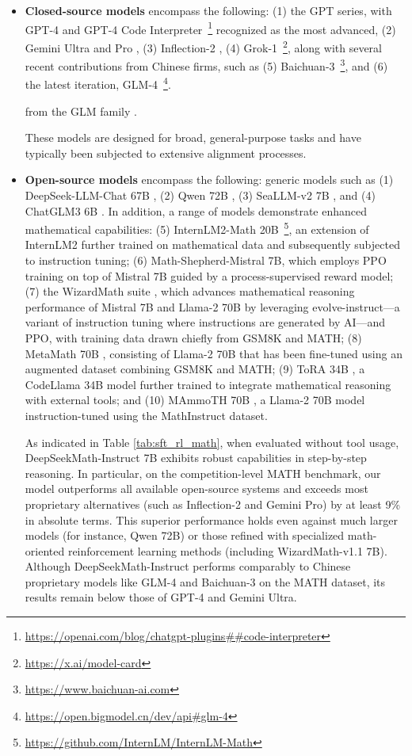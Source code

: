 \begin{itemize}[topsep=0pt]
\begin{itemize}[topsep=0pt]
    \item \textbf{Closed-source models} encompass the following: (1) the GPT series, with GPT-4 \citep{gpt4} and GPT-4 Code Interpreter~\footnote{\url{https://openai.com/blog/chatgpt-plugins\#\#code-interpreter}} recognized as the most advanced, (2) Gemini Ultra and Pro \citep{gemini}, (3) Inflection-2 \citep{inflection-2}, (4) Grok-1~\footnote{\url{https://x.ai/model-card}}, along with several recent contributions from Chinese firms, such as (5) Baichuan-3~\footnote{\url{https://www.baichuan-ai.com}}, and (6) the latest iteration, GLM-4~\footnote{\url{https://open.bigmodel.cn/dev/api\#glm-4}}.

    from the GLM family \citep{glm}.

These models are designed for broad, general-purpose tasks and have typically been subjected to extensive alignment processes.
\item \textbf{Open-source models} encompass the following: generic models such as (1) DeepSeek-LLM-Chat 67B \citep{deepseek-llm}, (2) Qwen 72B \citep{qwen}, (3) SeaLLM-v2 7B \citep{seallm}, and (4) ChatGLM3 6B \citep{chatglm3}. In addition, a range of models demonstrate enhanced mathematical capabilities: (5) InternLM2-Math 20B~\footnote{\url{https://github.com/InternLM/InternLM-Math}}, an extension of InternLM2 further trained on mathematical data and subsequently subjected to instruction tuning; (6) Math-Shepherd-Mistral 7B, which employs PPO training \citep{schulman2017proximal} on top of Mistral 7B \citep{mistral} guided by a process-supervised reward model; (7) the WizardMath suite \citep{wizardmath}, which advances mathematical reasoning performance of Mistral 7B and Llama-2 70B \citep{llama2} by leveraging evolve-instruct—a variant of instruction tuning where instructions are generated by AI—and PPO, with training data drawn chiefly from GSM8K and MATH; (8) MetaMath 70B \citep{metamath}, consisting of Llama-2 70B that has been fine-tuned using an augmented dataset combining GSM8K and MATH; (9) ToRA 34B \cite{tora}, a CodeLlama 34B model further trained to integrate mathematical reasoning with external tools; and (10) MAmmoTH 70B \citep{MathInstruct}, a Llama-2 70B model instruction-tuned using the MathInstruct dataset.

As indicated in Table \ref{tab:sft_rl_math}, when evaluated without tool usage, DeepSeekMath-Instruct 7B exhibits robust capabilities in step-by-step reasoning. In particular, on the competition-level MATH benchmark, our model outperforms all available open-source systems and exceeds most proprietary alternatives (such as Inflection-2 and Gemini Pro) by at least 9\% in absolute terms. This superior performance holds even against much larger models (for instance, Qwen 72B) or those refined with specialized math-oriented reinforcement learning methods (including WizardMath-v1.1 7B). Although DeepSeekMath-Instruct performs comparably to Chinese proprietary models like GLM-4 and Baichuan-3 on the MATH dataset, its results remain below those of GPT-4 and Gemini Ultra.


\end{itemize}
\end{itemize}
